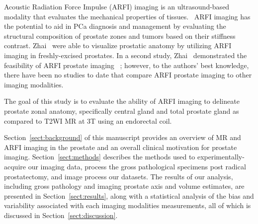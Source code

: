 Acoustic Radiation Force Impulse (ARFI) imaging is an ultrasound-based modality
that evaluates the mechanical properties of tissues.~\cite{Nightingale2002b}
ARFI imaging has the potential to aid in PCa diagnosis and management by
evaluating the structural composition of prostate zones and tumors based on
their stiffness contrast.  Zhai \etal~were able to visualize prostatic anatomy
by utilizing ARFI imaging in freshly-excised prostates. In a second study, Zhai
\etal~demonstrated the feasibility of ARFI prostate imaging
\invivo~\cite{Zhai2012}; however, to the authors’ best knowledge, there have
been no studies to date that compare \invivo ARFI prostate imaging to other
imaging modalities.~\cite{Zhai2010} 

The goal of this study is to evaluate the ability of ARFI imaging to delineate
prostate zonal anatomy, specifically central gland and total prostate gland
\invivo as compared to T2WI MR at 3T using an endorectal coil.

Section~\ref{sect:background} of this manuscript provides an overview of MR and
ARFI imaging in the prostate and an overall clinical motivation for prostate
imaging.  Section~\ref{sect:methods} describes the methods used to
experimentally-acquire our imaging data, process the gross pathological
specimens post radical prostatectomy, and image process our datasets.  The
results of our analysis, including gross pathology and imaging prostate axis
and volume estimates, are presented in Section~\ref{sect:results}, along with a
statistical analysis of the bias and variability associated with each imaging
modalities measurements, all of which is discussed in
Section~\ref{sect:discussion}.
